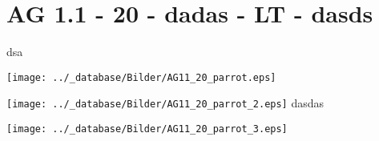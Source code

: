 \section{AG 1.1 - 20 - dadas - LT - dasds}

\begin{beispiel}[AG 1.1]{1}
dsa

\texttt{[image: ../\_database/Bilder/AG11\_20\_parrot.eps]}


\texttt{[image: ../\_database/Bilder/AG11\_20\_parrot\_2.eps]}
dasdas

\texttt{[image: ../\_database/Bilder/AG11\_20\_parrot\_3.eps]}
\end{beispiel}